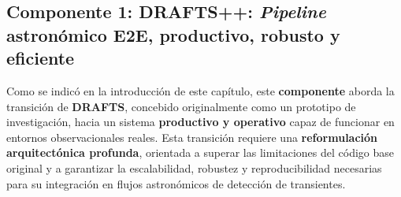 




\subsection{Componente 1: DRAFTS++: \textit{Pipeline} astronómico E2E, productivo, robusto y eficiente}

Como se indicó en la introducción de este capítulo, este \textbf{componente} aborda la transición de \textbf{DRAFTS}, concebido originalmente como un prototipo de investigación, hacia un sistema \textbf{productivo y operativo} capaz de funcionar en entornos observacionales reales. Esta transición requiere una \textbf{reformulación arquitectónica profunda}, orientada a superar las limitaciones del código base original y a garantizar la escalabilidad, robustez y reproducibilidad necesarias para su integración en flujos astronómicos de detección de transientes.




